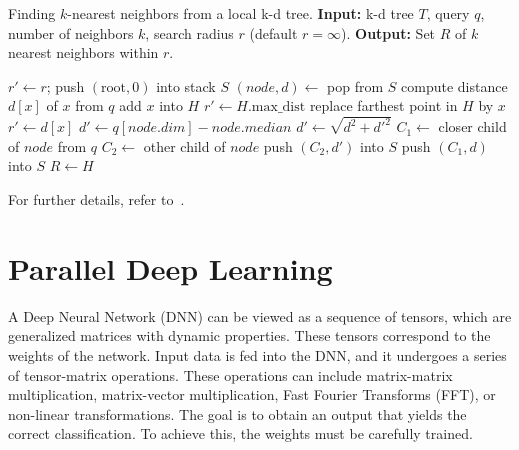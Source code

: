 \documentclass[12pt]{book}
\begin{document}
\begin{algorithm}[H]
\caption{Finding $k$-nearest neighbors from a local k-d tree. 
\newline \textbf{Input:} k-d tree $T$, query $q$, number of neighbors $k$, search radius $r$ (default $r=\infty$). 
\newline \textbf{Output:} Set $R$ of $k$ nearest neighbors within $r$.}
\label{alg:knnl}
\begin{algorithmic}[1]
    \State $r' \gets r$; push $(\text{root},0)$ into stack $S$
        \State $(node,d) \gets$ pop from $S$
                \State compute distance $d[x]$ of $x$ from $q$
                        \State add $x$ into $H$
                            \State $r' \gets H.\text{max\_dist}$
                        \EndIf
                        \State replace farthest point in $H$ by $x$
                        \State $r' \gets d[x]$
                    \EndIf
                \EndIf
            \EndFor
        \Else
                \State $d' \gets q[node.dim] - node.median$
                \State $d' \gets \sqrt{d^2 + {d'}^2}$
                \State $C_1 \gets$ closer child of $node$ from $q$
                \State $C_2 \gets$ other child of $node$
                    \State push $(C_2, d')$ into $S$
                \EndIf
                \State push $(C_1, d)$ into $S$
            \EndIf
        \EndIf
    \EndWhile
    \State $R \gets H$
\EndProcedure
\end{algorithmic}
\end{algorithm}

For further details, refer to~\cite{patwary2016panda}.


\section{Parallel Deep Learning}

A Deep Neural Network (DNN) can be viewed as a sequence of tensors, which are generalized matrices with dynamic properties. These tensors correspond to the weights of the network. Input data is fed into the DNN, and it undergoes a series of tensor-matrix operations. These operations can include matrix-matrix multiplication, matrix-vector multiplication, Fast Fourier Transforms (FFT), or non-linear transformations. The goal is to obtain an output that yields the correct classification. To achieve this, the weights must be carefully trained.
\end{document}
